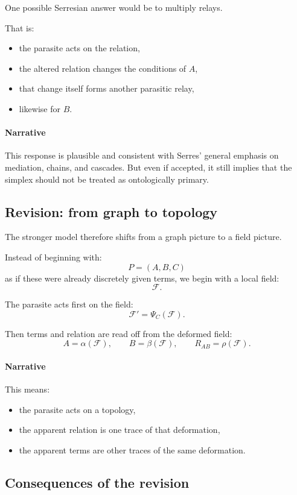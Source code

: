 One possible Serresian answer would be to multiply relays.

That is:
\begin{itemize}
\item the parasite acts on the relation,
\item the altered relation changes the conditions of \(A\),
\item that change itself forms another parasitic relay,
\item likewise for \(B\).
\end{itemize}

\paragraph{Narrative}
This response is plausible and consistent with Serres' general emphasis on mediation,
chains, and cascades.
But even if accepted, it still implies that the simplex should not be treated as
ontologically primary.

\subsection*{Revision: from graph to topology}

The stronger model therefore shifts from a graph picture to a field picture.

Instead of beginning with:
\[
P = (A,B,C)
\]
as if these were already discretely given terms, we begin with a local field:
\[
\mathcal{F}.
\]

The parasite acts first on the field:
\[
\mathcal{F}' = \Psi_C(\mathcal{F}).
\]

Then terms and relation are read off from the deformed field:
\[
A = \alpha(\mathcal{F}), \qquad B = \beta(\mathcal{F}), \qquad R_{AB} = \rho(\mathcal{F}).
\]

\paragraph{Narrative}
This means:
\begin{itemize}
\item the parasite acts on a topology,
\item the apparent relation is one trace of that deformation,
\item the apparent terms are other traces of the same deformation.
\end{itemize}

\subsection*{Consequences of the revision}

